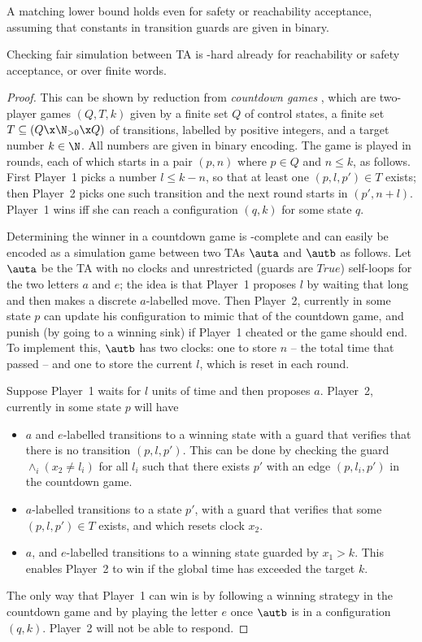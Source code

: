 A matching lower bound holds even for safety or reachability acceptance, assuming that constants in transition guards are given in binary.
\begin{lemma}
    \label{lem:GFGTA:fairsim-lb}
    Checking fair simulation between TA is \exptime-hard already for reachability or safety acceptance, or over finite words.
\end{lemma}
\begin{proof}
This can be shown by reduction from \emph{countdown games} \cite{JLS2008},
which are two-player games $(Q,T,k)$ given by a finite set $Q$ of control states, a finite set $T \subseteq (Q \x \N_{>0} \x Q)$ of transitions, labelled by positive integers, and a target number $k\in\N$.
All numbers are given in binary encoding.
The game is played in rounds, each of which starts in a pair $(p,n)$ where $p\in Q$ and $n \le k$,
as follows.
First Player~1 picks a number $l \le k-n$, so that at least one $(p,l,p')\in T$ exists;
then Player~2 picks one such transition and the next round starts in $(p',n+l)$.
Player~1 wins iff she can reach a configuration $(q,k)$ for some state $q$.

Determining the winner in a countdown game is \exptime-complete \cite{JLS2008}
and can easily be encoded as a simulation game between two TAs $\auta$ and $\autb$ as follows.
Let $\auta$ be the TA with no clocks and unrestricted (guards are $\mathit{True}$) self-loops 
for the two letters $a$ and $e$;
the idea is that Player~1 proposes $l$ by waiting that long and then makes a discrete $a$-labelled move.
Then Player~2, currently in some state $p$ can update his configuration to mimic that of the countdown game,
and punish (by going to a winning sink) if Player~1 cheated or the game should end.
To implement this, $\autb$ has two clocks: one to store $n$ -- the total time that passed -- and one to store the current $l$, which is reset in each round.

Suppose Player~1 waits for $l$ units of time and then proposes $a$. 
Player~2, currently in some state $p$ 
will have 
\begin{itemize}
    \item 
$a$ and $e$-labelled transitions to a winning state with a guard that verifies that
there is no transition $(p,l,p')$. 
This can be done by checking the guard $\wedge_{i} (x_2\neq l_i)$ for 
all $l_i$ such that there exists $p'$ with an edge $(p,l_i,p')$ in the countdown game.
\item $a$-labelled transitions to a state $p'$, with a guard that verifies that 
some $(p,l,p')\in T$ exists, and which resets clock $x_2$.
\item $a$, and $e$-labelled transitions to a winning state guarded by $x_1>k$.
    This enables Player~2 to win if the global time has exceeded the target $k$.
\end{itemize}
The only way that Player~1 can win is by following a winning strategy in the countdown game
and by playing the letter $e$ once $\autb$ is in a configuration $(q,k)$.
Player~2 will not be able to respond.
\end{proof}





